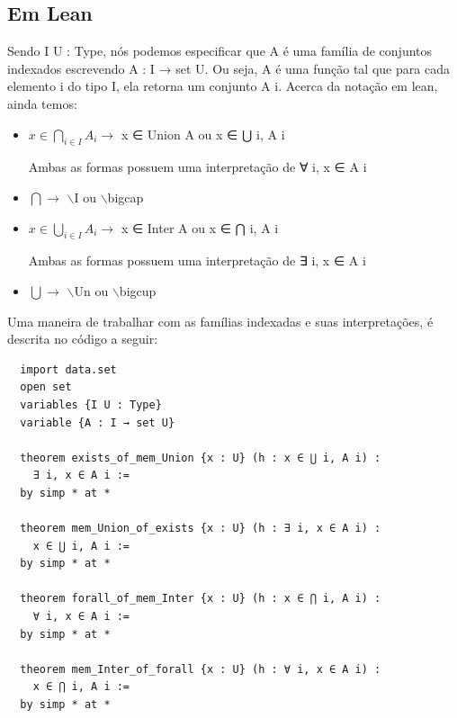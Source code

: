 \subsection{Em Lean}
Sendo {\selectfont I U : Type}, nós podemos especificar que {\selectfont A} é uma família de conjuntos indexados escrevendo {\selectfont A : I → set U}. Ou seja, {\selectfont A} é uma função tal que para cada elemento {\selectfont i} do tipo {\selectfont I}, ela retorna um conjunto {\selectfont A i}. Acerca da notação em lean, ainda temos:

\begin{itemize}
  \item $x \in \bigcap_{i \in I} A_i \rightarrow$ {\selectfont x ∈ Union A} ou {\selectfont x ∈ ⋃ i, A i}
  
  Ambas as formas possuem uma interpretação de {\selectfont ∀ i, x ∈ A i}

  \item $\bigcap \rightarrow$ {\selectfont $\backslash$I} ou {\selectfont $\backslash$bigcap}
  \item $x \in \bigcup_{i \in I} A_i \rightarrow$ {\selectfont x ∈ Inter A} ou {\selectfont x ∈ ⋂ i, A i}
  
  Ambas as formas possuem uma interpretação de {\selectfont ∃ i, x ∈ A i}

  \item $\bigcup \rightarrow$ {\selectfont $\backslash$Un} ou {\selectfont $\backslash$bigcup}
\end{itemize}

Uma maneira de trabalhar com as famílias indexadas e suas interpretações, é descrita no código a seguir:

\begin{lstlisting}
  import data.set
  open set
  variables {I U : Type}
  variable {A : I → set U}

  theorem exists_of_mem_Union {x : U} (h : x ∈ ⋃ i, A i) :
    ∃ i, x ∈ A i :=
  by simp * at *

  theorem mem_Union_of_exists {x : U} (h : ∃ i, x ∈ A i) :
    x ∈ ⋃ i, A i :=
  by simp * at *

  theorem forall_of_mem_Inter {x : U} (h : x ∈ ⋂ i, A i) :
    ∀ i, x ∈ A i :=
  by simp * at *

  theorem mem_Inter_of_forall {x : U} (h : ∀ i, x ∈ A i) :
    x ∈ ⋂ i, A i :=
  by simp * at *\end{lstlisting}

